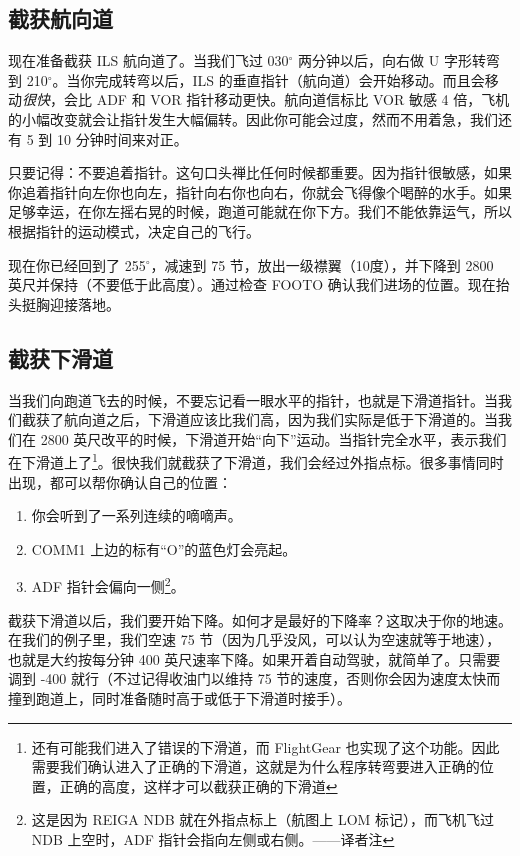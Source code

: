 \subsection{截获航向道}

现在准备截获 ILS 航向道了。当我们飞过 030$^\circ$ 两分钟以后，向右做 U 字形转弯到 210$^\circ$。当你完成转弯以后，ILS 的垂直指针（航向道）会开始移动。而且会移动\emph{很快}，会比 ADF 和 VOR 指针移动更快。航向道信标比 VOR 敏感 4 倍，飞机的小幅改变就会让指针发生大幅偏转。因此你可能会过度，然而不用着急，我们还有 5 到 10 分钟时间来对正。

只要记得：不要追着指针。这句口头禅比任何时候都重要。因为指针很敏感，如果你追着指针向左你也向左，指针向右你也向右，你就会飞得像个喝醉的水手。如果足够幸运，在你左摇右晃的时候，跑道可能就在你下方。我们不能依靠运气，所以根据指针的运动模式，决定自己的飞行。

现在你已经回到了 255$^\circ$，减速到 75 节，放出一级襟翼（10度），并下降到 2800 英尺并保持（不要低于此高度）。通过检查 FOOTO 确认我们进场的位置。现在抬头挺胸迎接落地。

\subsection{截获下滑道}

当我们向跑道飞去的时候，不要忘记看一眼水平的指针，也就是下滑道指针。当我们截获了航向道之后，下滑道应该比我们高，因为我们实际是低于下滑道的。当我们在 2800 英尺改平的时候，下滑道开始“向下”运动。当指针完全水平，表示我们在下滑道上了\footnote{还有可能我们进入了错误的下滑道，而 FlightGear 也实现了这个功能。因此需要我们确认进入了正确的下滑道，这就是为什么程序转弯要进入正确的位置，正确的高度，这样才可以截获正确的下滑道}。很快我们就截获了下滑道，我们会经过外指点标。很多事情同时出现，都可以帮你确认自己的位置：

\begin{enumerate}
\item 你会听到了一系列连续的嘀嘀声。
\item COMM1 上边的标有“O”的蓝色灯会亮起。
\item ADF 指针会偏向一侧\footnote{这是因为 REIGA NDB 就在外指点标上（航图上 LOM 标记），而飞机飞过 NDB 上空时，ADF 指针会指向左侧或右侧。——译者注}。
\end{enumerate}

截获下滑道以后，我们要开始下降。如何才是最好的下降率？这取决于你的地速。在我们的例子里，我们空速 75 节（因为几乎没风，可以认为空速就等于地速），也就是大约按每分钟 400 英尺速率下降。如果开着自动驾驶，就简单了。只需要调到 -400 就行（不过记得收油门以维持 75 节的速度，否则你会因为速度太快而撞到跑道上，同时准备随时高于或低于下滑道时接手）。


